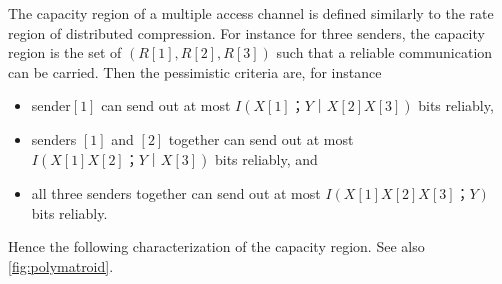 \documentclass[openany]{amsbook}
\numberwithin{equation}{chapter}
\numberwithin{figure}{chapter}
\numberwithin{table}{chapter}
\theoremstyle{definition}	理dfn:Definition~?s			理exa:Example~?s
\theoremstyle{remark}		理cla:Claim~?s				理rem:Remark~?s
\begin{document}
	The capacity region of a multiple access channel is defined
	similarly to the rate region of distributed compression.
	For instance for three senders, the capacity region is the set of
	$(R[1],R[2],R[3])$ such that a reliable communication can be carried.
	Then the pessimistic criteria are, for instance
	\begin{itemize}
		\item	sender$[1]$ can send out at most $I(X[1]；Y｜X[2]X[3])$ bits reliably,
		\item	senders $[1]$ and $[2]$ together can send out
				at most $I(X[1]X[2]；Y｜X[3])$ bits reliably, and
		\item	all three senders together can send out
				at most $I(X[1]X[2]X[3]；Y)$ bits reliably.
	\end{itemize}
	Hence the following characterization of the capacity region.
	See also \cref{fig:polymatroid}.
	
\end{document}
